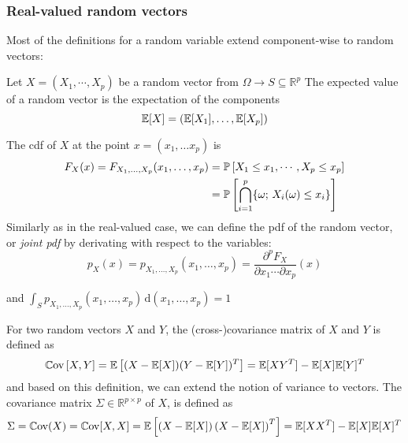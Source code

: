 \documentclass[../../Main_ManuscritThese.tex]{subfiles}
\begin{document}
\subsubsection{Real-valued random vectors}
 Most of the definitions for a random variable extend component-wise to random vectors:

\begin{definition}
 \label{def:joint_marginal_cond_densities}
 Let $X=(X_1,\cdots,X_p)$ be a random vector from $\Omega \rightarrow S\subseteq\mathbb{R}^p$
 The expected value of a random vector is the expectation of the components
 \begin{equation}
\mathbb{E}[X] = \left(\mathbb{E}[X_1],\dots,\mathbb{E}[X_p]\right)
\end{equation}

The cdf of $X$ at the point $x=(x_1,\dots x_p)$ is
   \begin{align}
     \label{eq:def_cdf_multi}
     F_{X}(x) = F_{X_1,\dots, X_p}(x_1,\dots, x_p) &= \mathbb{P}\left[X_1 \leq x_1, \cdots, X_p\leq x_p\right]\\
                                                   &= \mathbb{P}\left[\bigcap_{i=1}^p \{\omega;\,X_i(\omega) \leq x_i\}\right] \nonumber
  \end{align}
  Similarly as in the real-valued case, we can define the pdf of the
  random vector, or \emph{joint pdf} by derivating with respect to the
  variables:
  \begin{equation}
    p_{X}(x)= p_{X_1,\dots, X_p}(x_1,\dots, x_p) =\frac{\partial^p F_X}{\partial x_1 \cdots \partial x_p}(x)
  \end{equation}
  
  and $\int_{S}p_{X_1,\dots, X_p}(x_1,\dots, x_p)\,\mathrm{d}(x_1,\dots, x_p)=1$

  For two random vectors $X$ and $Y$, the (cross-)covariance matrix of
  $X$ and $Y$ is defined as
  \begin{equation}
    \mathbb{C}\mathrm{ov}\left[X,Y\right] = \mathbb{E}\left[(X-\mathbb{E}[X])(Y - \mathbb{E}[Y])^T\right] = \mathbb{E}[XY^T] - \mathbb{E}[X]\mathbb{E}[Y]^T
  \end{equation}
  and based on this definition, we can extend the notion of variance
  to vectors. The covariance matrix
  $\Sigma \in \mathbb{R}^{p\times p}$ of $X$, is defined as 
  \begin{equation}
    \Sigma = \mathbb{C}\mathrm{ov}(X)=\mathbb{C}\mathrm{ov}[X,X]= \mathbb{E}\left[\left(X - \mathbb{E}[X]\right)\left(X-\mathbb{E}[X]\right)^T\right] = \mathbb{E}[XX^T] - \mathbb{E}[X]\mathbb{E}[X]^T
  \end{equation}



\end{definition}
\end{document}
